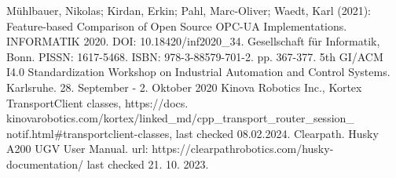 \documentclass[conference]{IEEEtran}
\begin{document}
\begin{thebibliography}{00}
Mühlbauer, Nikolas; Kirdan, Erkin; Pahl, Marc-Oliver; Waedt, Karl (2021): Feature-based Comparison of Open Source OPC-UA Implementations. INFORMATIK 2020. DOI: 10.18420/inf2020\_34. Gesellschaft für Informatik, Bonn. PISSN: 1617-5468. ISBN: 978-3-88579-701-2. pp. 367-377. 5th GI/ACM I4.0 Standardization Workshop on Industrial Automation and Control Systems. Karlsruhe. 28. September - 2. Oktober 2020
 Kinova Robotics Inc., Kortex TransportClient classes, https://docs.\\kinovarobotics.com/kortex/linked\_md/cpp\_transport\_router\_session\_\\notif.html\#transportclient-classes, last checked 08.02.2024.
 Clearpath. Husky A200 UGV User Manual. url: https://clearpathrobotics.com/husky-documentation/ last checked 21. 10. 2023.
\end{thebibliography}
\end{document}
